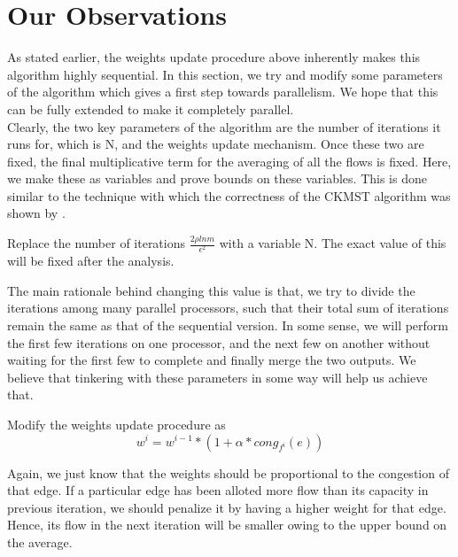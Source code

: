\documentclass[BTech]{iitmdiss}
\begin{document}
	\section{Our Observations}
	  As stated earlier, the weights update procedure above inherently makes this algorithm highly sequential. In this section, we try and modify 
	  some parameters of the algorithm which gives a first step towards parallelism. We hope that this can be fully extended to make it completely
	  parallel. \\
	  
	  Clearly, the two key parameters of the algorithm are the number of iterations it runs for, which is N, and the weights update mechanism.
	  Once these two are fixed, the final multiplicative term for the averaging of all the flows is fixed. Here, we make these as variables and prove bounds 
	  on these variables. This is done similar to the technique with which the correctness of the CKMST algorithm was shown by \cite{DBLP:journals/corr/abs-1010-2921}. \\
	  
	  \begin{modif}
	    Replace the number of iterations $\frac{2 \rho ln m}{\epsilon^2}$ with a variable N. The exact value of this will be fixed after the analysis.
	  \end{modif}
	  
	  The main rationale behind changing this value is that, we try to divide the iterations among many parallel processors, such that their total
	  sum of iterations remain the same as that of the sequential version. In some sense, we will perform the first few iterations on one processor,
	  and the next few on another without waiting for the first few to complete and finally merge the two outputs. We believe that tinkering with these
	  parameters in some way will help us achieve that.
	  
	  \begin{modif}
	   Modify the weights update procedure as 
	   $$w^{i} = w^{i-1} \ast \left( 1+\alpha \ast cong_{f^i}(e)\right)$$
	  \end{modif}
	  
	  Again, we just know that the weights should be proportional to the congestion of that edge. If a particular edge has been alloted more flow
	  than its capacity in previous iteration, we should penalize it by having a higher weight for that edge. Hence, its flow in the next iteration
	  will be smaller owing to the upper bound on the average.
	  
\end{document}
